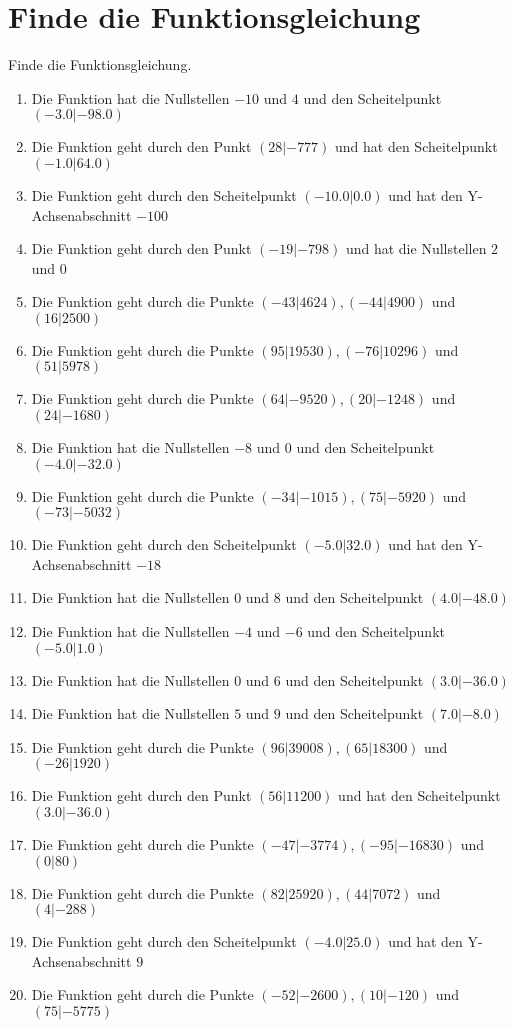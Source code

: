 \documentclass{article}%
\begin{document}
\section{Finde die Funktionsgleichung}%
\label{sec:FindedieFunktionsgleichung}%
Finde die Funktionsgleichung.%
\begin{enumerate}[label=\alph*)]%
\item%
 Die Funktion hat die Nullstellen $-10$ und $4$ und den Scheitelpunkt $(-3.0|-98.0)$%
\item%
 Die Funktion geht durch den Punkt $(28|-777)$ und hat den Scheitelpunkt $(-1.0|64.0)$%
\item%
 Die Funktion geht durch den Scheitelpunkt $(-10.0|0.0)$ und hat den Y-Achsenabschnitt $-100$%
\item%
 Die Funktion geht durch den Punkt $(-19|-798)$ und hat die Nullstellen $2$ und $0$%
\item%
 Die Funktion geht durch die Punkte $(-43|4624),(-44|4900)$ und $(16|2500)$%
\item%
 Die Funktion geht durch die Punkte $(95|19530),(-76|10296)$ und $(51|5978)$%
\item%
 Die Funktion geht durch die Punkte $(64|-9520),(20|-1248)$ und $(24|-1680)$%
\item%
 Die Funktion hat die Nullstellen $-8$ und $0$ und den Scheitelpunkt $(-4.0|-32.0)$%
\item%
 Die Funktion geht durch die Punkte $(-34|-1015),(75|-5920)$ und $(-73|-5032)$%
\item%
 Die Funktion geht durch den Scheitelpunkt $(-5.0|32.0)$ und hat den Y-Achsenabschnitt $-18$%
\item%
 Die Funktion hat die Nullstellen $0$ und $8$ und den Scheitelpunkt $(4.0|-48.0)$%
\item%
 Die Funktion hat die Nullstellen $-4$ und $-6$ und den Scheitelpunkt $(-5.0|1.0)$%
\item%
 Die Funktion hat die Nullstellen $0$ und $6$ und den Scheitelpunkt $(3.0|-36.0)$%
\item%
 Die Funktion hat die Nullstellen $5$ und $9$ und den Scheitelpunkt $(7.0|-8.0)$%
\item%
 Die Funktion geht durch die Punkte $(96|39008),(65|18300)$ und $(-26|1920)$%
\item%
 Die Funktion geht durch den Punkt $(56|11200)$ und hat den Scheitelpunkt $(3.0|-36.0)$%
\item%
 Die Funktion geht durch die Punkte $(-47|-3774),(-95|-16830)$ und $(0|80)$%
\item%
 Die Funktion geht durch die Punkte $(82|25920),(44|7072)$ und $(4|-288)$%
\item%
 Die Funktion geht durch den Scheitelpunkt $(-4.0|25.0)$ und hat den Y-Achsenabschnitt $9$%
\item%
 Die Funktion geht durch die Punkte $(-52|-2600),(10|-120)$ und $(75|-5775)$%
\end{enumerate}

%
\end{document}
